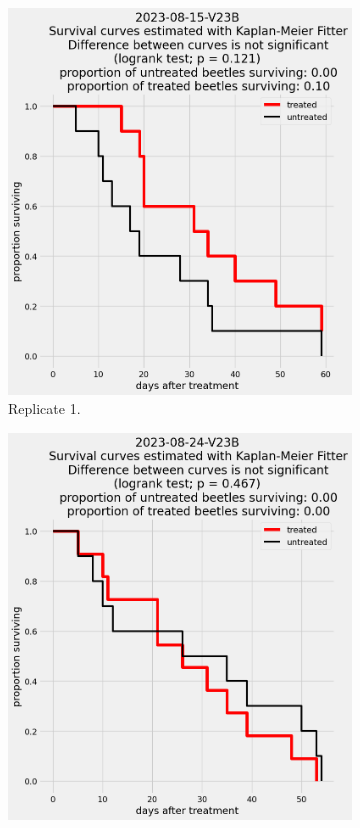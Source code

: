 \documentclass[12pt,letterpaper,english,bibliography=totocnumbered, abstract=on]{scrartcl}
\begin{document}

\begin{figure}[h]
	\centering
	\begin{subfigure}{.3\textwidth}
		\includegraphics[width=\linewidth]{images/survival_curves/2023-08-15-V23B}
		\caption{Replicate 1.}
	\end{subfigure}
	\begin{subfigure}{.3\textwidth}
		\includegraphics[width=\textwidth]{images/survival_curves/2023-08-24-V23B}

\end{subfigure}
\end{figure}
\end{document}
